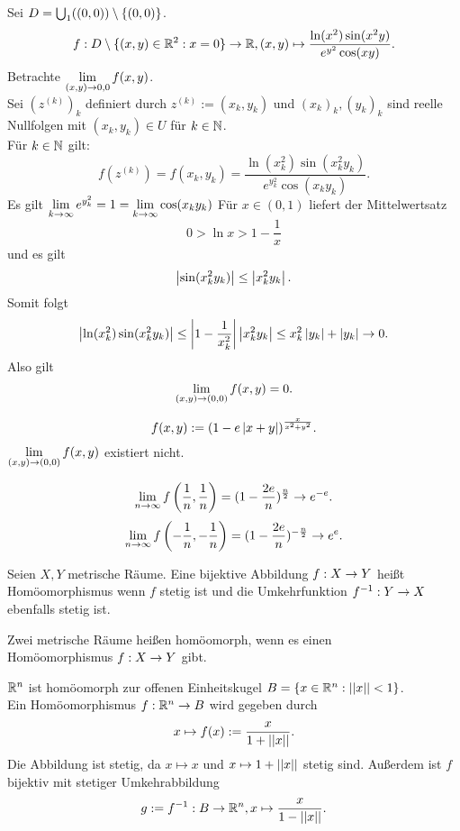 \documentclass[../ana2u.tex]{subfiles}
\begin{document}
\begin{bsp}
    Sei \( D = \bigcup_1( (0,0) ) \setminus \{(0,0)\} \).
    \[ f:D \setminus \{(x,y) \in \mathbb{R}^2: x = 0 \} \rightarrow \mathbb{R}, 
    (x,y) \mapsto \frac{ \ln (x^2) \sin(x^2 y) }{ 
        e^{y^2} \cos(xy) }. \]
    Betrachte \( \lim\limits_{(x,y)\rightarrow{}0,0} f(x,y) \). \\
    Sei \( (z^{(k)})_k \) definiert durch 
    \( z^{(k)} := (x_k, y_k) \)
    und \( (x_k)_k, (y_k)_k \) sind reelle 
    Nullfolgen mit \( (x_k, y_k) \in U \)
    für \(k \in \mathbb{N}\).\\
    Für \(k \in \mathbb{N}\) gilt:
    \[ f(z^{(k)}) = f(x_k, y_k) 
    = \frac{ \ln(x_k^2) \sin(x_k^2 y_k) }{ 
        e^{y_k^2} \cos(x_k y_k) }. \]
    Es gilt \( \lim\limits_{k\rightarrow\infty} e^{y_k^2} = 1 
    = \lim\limits_{k\rightarrow\infty} \cos(x_k y_k) \)
    Für \( x \in (0,1) \) liefert der Mittelwertsatz 
    \[ 0 > \ln x > 1 - \frac{1}{x} \]
    und es gilt
    \[ \left| \sin(x_k^2 y_k) \right| \leq \left| x_k^2 y_k \right|. \]
    Somit folgt 
    \[ \left|\ln(x_k^2) \sin(x_k^2 y_k)\right| 
    \leq \left| 1 - \frac{1}{x_k^2} \right|\left|x_k^2 y_k\right| 
    \leq x_k^2 \left|y_k\right| + \left|y_k\right| \rightarrow 0. \]
    Also gilt 
    \[ \lim\limits_{(x,y)\rightarrow{}(0,0)} f(x,y) = 0. \]
\end{bsp}
\begin{bsp}
    \[ f(x,y) := (1-e\left|x+y\right|)^{\frac{x}{x^2+y^2}}. \]
    \( \lim\limits_{(x,y)\rightarrow{}(0,0)} f(x,y) \) existiert nicht.
\end{bsp}
\begin{bew}
    \[ \lim\limits_{n\rightarrow\infty} f\left(\frac{1}{n}, \frac{1}{n}\right) 
    = (1 - \frac{2e}{n})^\frac{n}{2} \rightarrow e^{-e}. \]
    \[ \lim\limits_{n\rightarrow\infty} f\left(-\frac{1}{n}, -\frac{1}{n}\right) 
    = (1 - \frac{2e}{n})^{-\frac{n}{2}} \rightarrow e^e. \]
\end{bew}
\begin{defi}[Homöomorphismus]
    Seien \( X, Y \) metrische Räume. Eine 
    bijektive Abbildung \( f:X\rightarrow Y \) 
    heißt Homöomorphismus wenn \(f\) stetig 
    ist und die Umkehrfunktion \( f^{-1}:Y\rightarrow X \) 
    ebenfalls stetig ist.
    
    Zwei metrische Räume heißen homöomorph, 
    wenn es einen \\Homöomorphismus 
    \( f:X\rightarrow Y \) gibt.
\end{defi}
\begin{bsp}
    \(\mathbb{R}^n\) ist homöomorph zur offenen
        Einheitskugel \( B = \{x \in \mathbb{R}^n: \left|\left|x\right|\right| < 1\} \). \\
        Ein Homöomorphismus \( f:\mathbb{R}^n\rightarrow B \) 
        wird gegeben durch 
        \[ x \mapsto f(x) := \frac{x}{1 + \left|\left|x\right|\right|}. \]
        Die Abbildung ist stetig, da \( x \mapsto x \) 
        und \( x \mapsto 1 + \left|\left|x\right|\right| \) stetig sind.
        Außerdem ist \(f\) bijektiv mit stetiger Umkehrabbildung
        \[ g := f^{-1}:B\rightarrow \mathbb{R}^n, 
        x \mapsto \frac{x}{1 - \left|\left|x\right|\right|}. \]
\end{bsp}
\end{document}
